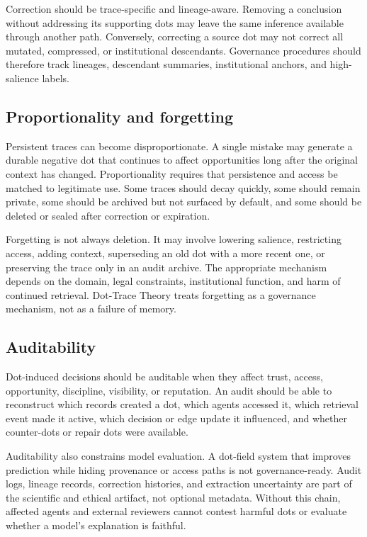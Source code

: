 \documentclass[11pt]{article}
\theoremstyle{remark}
\begin{document}
Correction should be trace-specific and lineage-aware. Removing a conclusion without addressing its supporting dots may leave the same inference available through another path. Conversely, correcting a source dot may not correct all mutated, compressed, or institutional descendants. Governance procedures should therefore track lineages, descendant summaries, institutional anchors, and high-salience labels.

\subsection{Proportionality and forgetting}\label{proportionality-forgetting}

Persistent traces can become disproportionate. A single mistake may generate a durable negative dot that continues to affect opportunities long after the original context has changed. Proportionality requires that persistence and access be matched to legitimate use. Some traces should decay quickly, some should remain private, some should be archived but not surfaced by default, and some should be deleted or sealed after correction or expiration.

Forgetting is not always deletion. It may involve lowering salience, restricting access, adding context, superseding an old dot with a more recent one, or preserving the trace only in an audit archive. The appropriate mechanism depends on the domain, legal constraints, institutional function, and harm of continued retrieval. Dot-Trace Theory treats forgetting as a governance mechanism, not as a failure of memory.

\subsection{Auditability}\label{auditability}

Dot-induced decisions should be auditable when they affect trust, access, opportunity, discipline, visibility, or reputation. An audit should be able to reconstruct which records created a dot, which agents accessed it, which retrieval event made it active, which decision or edge update it influenced, and whether counter-dots or repair dots were available.

Auditability also constrains model evaluation. A dot-field system that improves prediction while hiding provenance or access paths is not governance-ready. Audit logs, lineage records, correction histories, and extraction uncertainty are part of the scientific and ethical artifact, not optional metadata. Without this chain, affected agents and external reviewers cannot contest harmful dots or evaluate whether a model's explanation is faithful.
\end{document}
